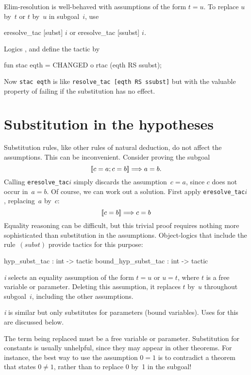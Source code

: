 Elim-resolution is well-behaved with assumptions of the form $t=u$.
To replace $u$ by~$t$ or $t$ by~$u$ in subgoal~$i$, use
\begin{ttbox} 
eresolve_tac [subst] \(i\)    {\rm or}    eresolve_tac [ssubst] \(i\){\it.}
\end{ttbox}

Logics \HOL, {\FOL} and {\ZF} define the tactic  by
\begin{ttbox} 
fun stac eqth = CHANGED o rtac (eqth RS ssubst);
\end{ttbox}
Now {\tt stac~eqth} is like {\tt resolve_tac [eqth RS ssubst]} but with the
valuable property of failing if the substitution has no effect.


\section{Substitution in the hypotheses}
Substitution rules, like other rules of natural deduction, do not affect
the assumptions.  This can be inconvenient.  Consider proving the subgoal
\[ \mathopen{[\![} c=a; c=b\mathclose{]\!]} \Longrightarrow a=b. \]
Calling {\tt eresolve_tac\ts[ssubst]\ts\(i\)} simply discards the
assumption~$c=a$, since $c$ does not occur in~$a=b$.  Of course, we can
work out a solution.  First apply {\tt eresolve_tac\ts[subst]\ts\(i\)},
replacing~$a$ by~$c$:
\[ \mathopen{[\![} c=b\mathclose{]\!]} \Longrightarrow c=b \]
Equality reasoning can be difficult, but this trivial proof requires
nothing more sophisticated than substitution in the assumptions.
Object-logics that include the rule~$(subst)$ provide tactics for this
purpose:
\begin{ttbox} 
hyp_subst_tac       : int -> tactic
bound_hyp_subst_tac : int -> tactic
\end{ttbox}
\begin{ttdescription}
\item[\ttindexbold{hyp_subst_tac} {\it i}] 
  selects an equality assumption of the form $t=u$ or $u=t$, where $t$ is a
  free variable or parameter.  Deleting this assumption, it replaces $t$
  by~$u$ throughout subgoal~$i$, including the other assumptions.

\item[\ttindexbold{bound_hyp_subst_tac} {\it i}] 
  is similar but only substitutes for parameters (bound variables).
  Uses for this are discussed below.
\end{ttdescription}
The term being replaced must be a free variable or parameter.  Substitution
for constants is usually unhelpful, since they may appear in other
theorems.  For instance, the best way to use the assumption $0=1$ is to
contradict a theorem that states $0\not=1$, rather than to replace 0 by~1
in the subgoal!

